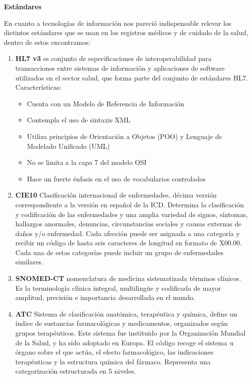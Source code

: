 {\correccionTexto
\textbf{Estándares}


En cuanto a tecnologías de información nos pareció indispensable relevar los distintos estándares que se usan en los registros médicos y de cuidado de la salud, dentro de estos encontramos:

\begin{enumerate}
	\item\textbf{HL7 v3} es conjunto de especificaciones de interoperabilidad para transacciones entre sistemas de información y aplicaciones de software utilizados en el sector salud, que forma parte del conjunto de estándares HL7. Características:
    	\begin{itemize}
			\item Cuenta con un Modelo de Referencia de Información
            \item Contempla el uso de sintaxis XML
            \item Utiliza principios de Orientación a Objetos (POO) y Lenguaje de Modelado Unificado (UML)
            \item No se limita a la capa 7 del modelo OSI
            \item Hace un fuerte énfasis en el uso de vocabularios controlados
		\end{itemize}
    
    \item\textbf{CIE10}  Clasificación internacional de enfermedades, décima versión correspondiente a la versión en español de la ICD. Determina la clasificación y codificación de las enfermedades y una amplia variedad de signos, síntomas, hallazgos anormales, denuncias, circunstancias sociales y causas externas de daños y/o enfermedad. Cada afección puede ser asignada a una categoría y recibir un código de hasta seis caracteres de longitud en formato de X00.00. Cada una de estas categorías puede incluir un grupo de enfermedades similares.
    
    \item\textbf{SNOMED-CT} nomenclatura de medicina sistematizada \- términos clínicos. Es la terminología clínica integral, multiling\"{u}e y codificada de mayor amplitud, precisión e importancia desarrollada en el mundo.
    
    \item\textbf{ATC} Sistema de clasificación anatómica, terapéutica y química, define un índice de sustancias farmacológicas y medicamentos, organizados según grupos terapéuticos. Este sistema fue instituido por la Organización Mundial de la Salud, y ha sido adoptado en Europa. El código recoge el sistema u órgano sobre el que actúa, el efecto farmacológico, las indicaciones terapéuticas y la estructura química del fármaco. Representa una categorización estructurada en 5 niveles.
    

\end{enumerate}}
